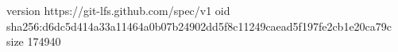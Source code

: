version https://git-lfs.github.com/spec/v1
oid sha256:d6dc5d414a33a11464a0b07b24902dd5f8c11249caead5f197fe2cb1e20ca79c
size 174940
